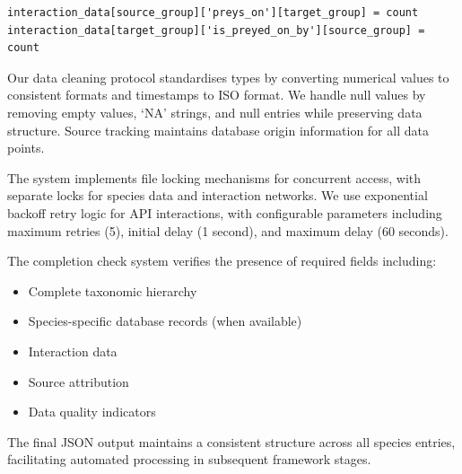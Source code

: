 \begin{verbatim}
interaction_data[source_group]['preys_on'][target_group] = count
interaction_data[target_group]['is_preyed_on_by'][source_group] = count
\end{verbatim}

Our data cleaning protocol standardises types by converting numerical values to consistent formats and timestamps to ISO format. We handle null values by removing empty values, `NA' strings, and null entries while preserving data structure. Source tracking maintains database origin information for all data points.

The system implements file locking mechanisms for concurrent access, with separate locks for species data and interaction networks. We use exponential backoff retry logic for API interactions, with configurable parameters including maximum retries (5), initial delay (1 second), and maximum delay (60 seconds).

The completion check system verifies the presence of required fields including:
\begin{itemize}
\item Complete taxonomic hierarchy
\item Species-specific database records (when available)
\item Interaction data
\item Source attribution
\item Data quality indicators
\end{itemize}

The final JSON output maintains a consistent structure across all species entries, facilitating automated processing in subsequent framework stages.

\label{supp:diet_matrix}



